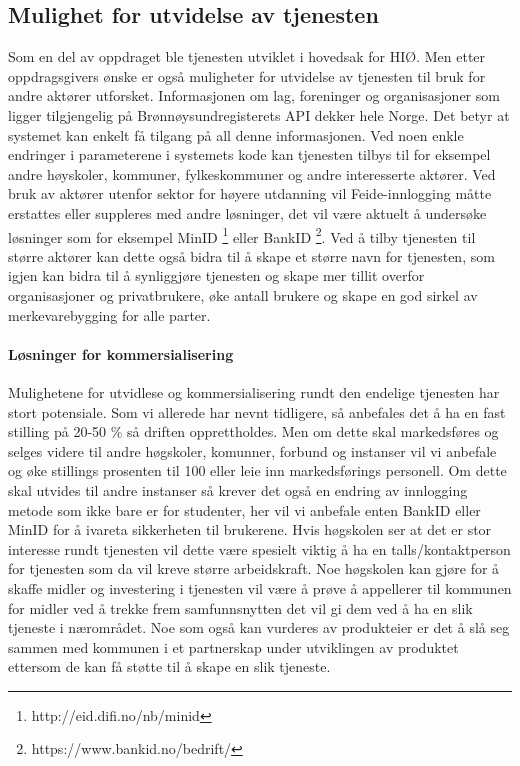 \subsection{Mulighet for utvidelse av tjenesten}
Som en del av oppdraget ble tjenesten utviklet i hovedsak for HIØ. Men etter oppdragsgivers ønske er også muligheter for utvidelse av tjenesten til bruk for andre aktører utforsket. Informasjonen om lag, foreninger og organisasjoner som ligger tilgjengelig på Brønnøysundregisterets API dekker hele Norge. Det betyr at systemet kan enkelt få tilgang på all denne informasjonen. Ved noen enkle endringer i parameterene i systemets kode kan tjenesten tilbys til for eksempel andre høyskoler, kommuner, fylkeskommuner og andre interesserte aktører. Ved bruk av aktører utenfor sektor for høyere utdanning vil Feide-innlogging måtte erstattes eller suppleres med andre løsninger, det vil være aktuelt å undersøke løsninger som for eksempel MinID \footnote{http://eid.difi.no/nb/minid} eller BankID \footnote{https://www.bankid.no/bedrift/}. Ved å tilby tjenesten til større aktører kan dette også bidra til å skape et større navn for tjenesten, som igjen kan bidra til å synliggjøre tjenesten og skape mer tillit overfor organisasjoner og privatbrukere, øke antall brukere og skape en god sirkel av merkevarebygging for alle parter.

\paragraph{Løsninger for kommersialisering}

Mulighetene for utvidlese og kommersialisering rundt den endelige tjenesten har stort potensiale. Som vi allerede har nevnt tidligere, så anbefales det å ha en fast stilling på 20-50 \% så driften opprettholdes. Men om dette skal markedsføres og selges videre til andre høgskoler, komunner, forbund og instanser vil vi anbefale og øke stillings prosenten til 100 eller leie inn markedsførings personell. Om dette skal utvides til andre instanser så krever det også en endring av innlogging metode som ikke bare er for studenter, her vil vi anbefale enten BankID eller MinID for å ivareta sikkerheten til brukerene. Hvis høgskolen ser at det er stor interesse rundt tjenesten vil dette være spesielt viktig å ha en talls/kontaktperson for tjenesten som da vil kreve større arbeidskraft. Noe høgskolen kan gjøre for å skaffe midler og investering i tjenesten vil være å prøve å appellerer til kommunen for midler ved å trekke frem samfunnsnytten det vil gi dem ved å ha en slik tjeneste i nærområdet. Noe som også kan vurderes av produkteier er det å slå seg sammen med kommunen i et partnerskap under utviklingen av produktet ettersom de kan få støtte til å skape en slik tjeneste.

